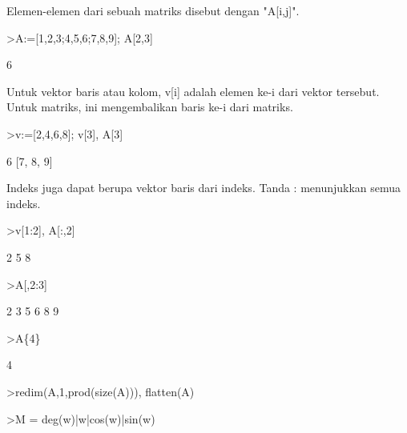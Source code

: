 \documentclass[a4paper,10pt]{article}
\begin{document}
\begin{eulernotebook}
\begin{eulercomment}
\begin{eulercomment}
\begin{eulercomment}
\begin{eulercomment}
\begin{eulercomment}
\begin{eulercomment}
\begin{eulercomment}
\begin{eulercomment}
\begin{eulercomment}
\begin{eulercomment}
\begin{eulercomment}
\begin{eulercomment}
\begin{eulercomment}
\begin{eulercomment}
\begin{eulercomment}
\begin{eulercomment}
\begin{eulercomment}
\begin{eulercomment}
\begin{eulercomment}
\begin{eulercomment}
\begin{eulercomment}
Elemen-elemen dari sebuah matriks disebut dengan "A[i,j]".
\end{eulercomment}
\begin{eulerprompt}
>A:=[1,2,3;4,5,6;7,8,9]; A[2,3]
\end{eulerprompt}
\begin{euleroutput}
  6
\end{euleroutput}
\begin{eulercomment}
Untuk vektor baris atau kolom, v[i] adalah elemen ke-i dari vektor
tersebut. Untuk matriks, ini mengembalikan baris ke-i dari matriks.
\end{eulercomment}
\begin{eulerprompt}
>v:=[2,4,6,8]; v[3], A[3]
\end{eulerprompt}
\begin{euleroutput}
  6
  [7,  8,  9]
\end{euleroutput}
\begin{eulercomment}
Indeks juga dapat berupa vektor baris dari indeks. Tanda : menunjukkan
semua indeks.
\end{eulercomment}
\begin{eulerprompt}
>v[1:2], A[:,2]
\end{eulerprompt}
\begin{euleroutput}
  [2,  4]
              2 
              5 
              8 
\end{euleroutput}
\begin{eulerprompt}
>A[,2:3]
\end{eulerprompt}
\begin{euleroutput}
              2             3 
              5             6 
              8             9 
\end{euleroutput}
\begin{eulerprompt}
>A\{4\}
\end{eulerprompt}
\begin{euleroutput}
  4
\end{euleroutput}
\begin{eulerprompt}
>redim(A,1,prod(size(A))), flatten(A)
\end{eulerprompt}
\begin{euleroutput}
  [1,  2,  3,  4,  5,  6,  7,  8,  9]
  [1,  2,  3,  4,  5,  6,  7,  8,  9]
\end{euleroutput}
\begin{eulerprompt}
>M = deg(w)|w|cos(w)|sin(w)
\end{eulerprompt}

\end{eulercomment}
\end{eulercomment}
\end{eulercomment}
\end{eulercomment}
\end{eulercomment}
\end{eulercomment}
\end{eulercomment}
\end{eulercomment}
\end{eulercomment}
\end{eulercomment}
\end{eulercomment}
\end{eulercomment}
\end{eulercomment}
\end{eulercomment}
\end{eulercomment}
\end{eulercomment}
\end{eulercomment}
\end{eulercomment}
\end{eulercomment}
\end{eulercomment}
\end{eulernotebook}
\end{document}
